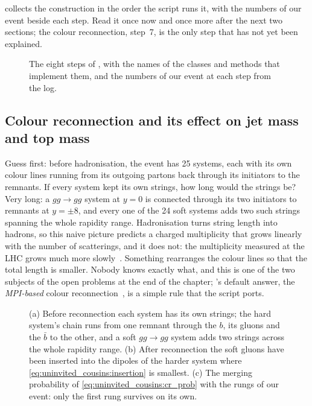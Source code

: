  collects the construction in the order the
script runs it, with the numbers of our event beside each step. Read it
once now and once more after the next two sections; the colour
reconnection, step~7, is the only step that has not yet been explained.

\begin{figure}[htbp]\centering
\resizebox{\textwidth}{!}{}
\caption[The MPI stage as a flow chart]{The eight steps of
, with the names of the classes
and methods that implement them, and the numbers of our event at each step
from the  log.}
\label{fig:uninvited_cousins:flow}
\end{figure}

\subsection{Colour reconnection and its effect on jet mass and top mass}
\label{sec:uninvited_cousins:colour_reconnection_and_its_effect_on_je}

Guess first: before hadronisation, the event has 25 systems, each with its
own colour lines running from its outgoing partons back through its
initiators to the remnants. If every system kept its own strings, how long
would the strings be? Very long: a $gg\to gg$ system at $y=0$ is connected
through its two initiators to remnants at $y=\pm8$, and every one of the
24 soft systems adds two such strings spanning the whole rapidity range.
Hadronisation turns string length into hadrons, so this naive picture
predicts a charged multiplicity that grows linearly with the number of
scatterings, and it does not: the multiplicity measured at the LHC grows
much more slowly~\cite{Sjostrand:2017cdm}. Something rearranges the colour
lines so that the total length is smaller. Nobody knows exactly what, and
this is one of the two subjects of the open problems at the end of the
chapter; \PYTHIA's default answer, the \emph{MPI-based} colour
reconnection~\cite{Sjostrand:2004pf,Sjostrand:2013cya}, is a simple rule
that the script ports.

\begin{figure}[htbp]\centering
\resizebox{\textwidth}{!}{}
\caption[Colour reconnection in the MPI-based model]{(a) Before
reconnection each system has its own strings; the hard system's chain runs
from one remnant through the $b$, its gluons and the $\bar b$ to the other,
and a soft $gg\to gg$ system adds two strings across the whole rapidity
range. (b) After reconnection the soft gluons have been inserted into the
dipoles of the harder system where
\cref{eq:uninvited_cousins:insertion} is smallest. (c) The merging
probability of \cref{eq:uninvited_cousins:cr_prob} with the rungs of our
event: only the first rung survives on its own.}
\label{fig:uninvited_cousins:cr_sketch}
\end{figure}

